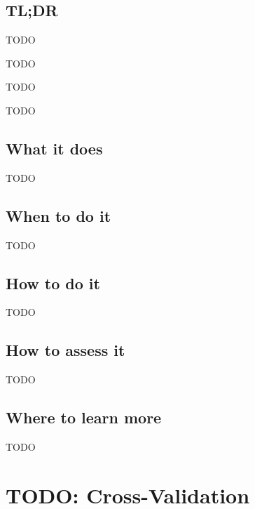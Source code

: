\documentclass[
]{book}
\providecommand{\tightlist}{%
  \setlength{\itemsep}{0pt}\setlength{\parskip}{0pt}}
\begin{document}
\hypertarget{tldr-7}{%
\section{TL;DR}\label{tldr-7}}

\begin{description}
\tightlist
\item[What it does]
TODO
\item[When to do it]
TODO
\item[How to do it]
TODO
\item[How to assess it]
TODO
\end{description}

\hypertarget{what-it-does-7}{%
\section{What it does}\label{what-it-does-7}}

TODO

\hypertarget{when-to-do-it-7}{%
\section{When to do it}\label{when-to-do-it-7}}

TODO

\hypertarget{how-to-do-it-7}{%
\section{How to do it}\label{how-to-do-it-7}}

TODO

\hypertarget{how-to-assess-it-7}{%
\section{How to assess it}\label{how-to-assess-it-7}}

TODO

\hypertarget{where-to-learn-more-7}{%
\section{Where to learn more}\label{where-to-learn-more-7}}

TODO

\hypertarget{cross-validation}{%
\chapter{TODO: Cross-Validation}\label{cross-validation}}
\end{document}

